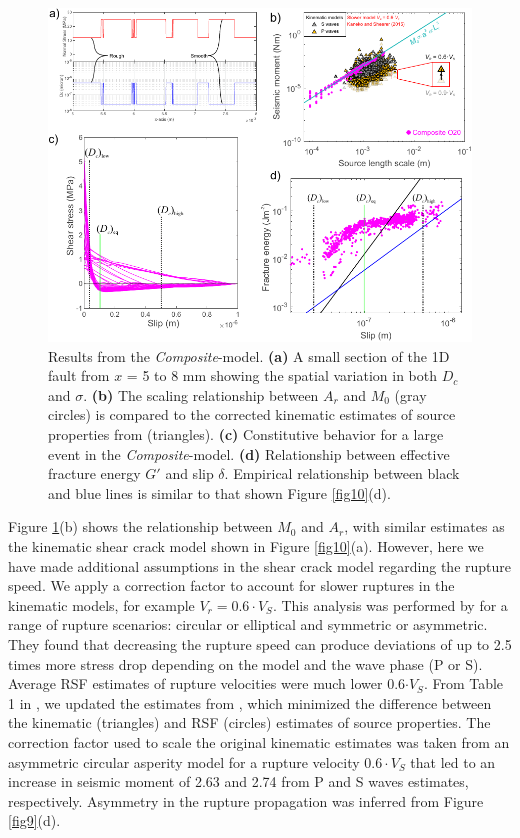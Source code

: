 \documentclass[preprint,1p, 10pt,authoryear]{elsarticle}
\begin{document}
\begin{figure}
	\centering
	\includegraphics{FIG12_revised.pdf} 
	\caption{Results from the \textit{Composite}-model. \textbf{(a)} A small section of the 1D fault from $x$ = 5 to 8 mm showing the spatial variation in both $D_{c}$ and $\sigma$. \textbf{(b)} The scaling relationship between $A_{r}$ and $M_{0}$ (gray circles) is compared to the corrected kinematic estimates of source properties from \citet{Selvadurai2019} (triangles).   \textbf{(c)} Constitutive behavior for a large event in the \textit{Composite}-model. \textbf{(d)} Relationship between effective fracture energy $G'$ and slip $\delta$. Empirical relationship between black and blue lines is similar to that shown Figure \ref{fig10}(d).}
	\label{fig12}
\end{figure}

Figure \ref{fig12}(b) shows the relationship between $M_{0}$ and $A_{r}$, with similar estimates as the kinematic shear crack model shown in Figure \ref{fig10}(a). However, here we have made additional assumptions in the shear crack model regarding the rupture speed.  We apply a correction factor to account for slower ruptures in the kinematic models, for example $V_{r} = 0.6\cdot V_{S}$.  This analysis was performed by \citet{Kaneko2015} for a range of rupture scenarios: circular or elliptical and symmetric or asymmetric.  They found that decreasing the rupture speed can produce deviations of up to 2.5 times more stress drop depending on the model and the wave phase (P or S).  Average RSF estimates of rupture velocities were much lower 0.6$\cdot V_{S}$.  From Table 1 in \citet{Kaneko2015}, we updated the estimates from \citet{Selvadurai2019}, which minimized the difference between the kinematic (triangles) and RSF (circles) estimates of source properties.  The correction factor used to scale the original kinematic estimates was taken from an asymmetric circular asperity model for a rupture velocity $0.6\cdot V_{S}$ that led to an increase in seismic moment of 2.63 and 2.74 from P and S waves estimates, respectively.  Asymmetry in the rupture propagation was inferred from Figure \ref{fig9}(d).
\end{document}
